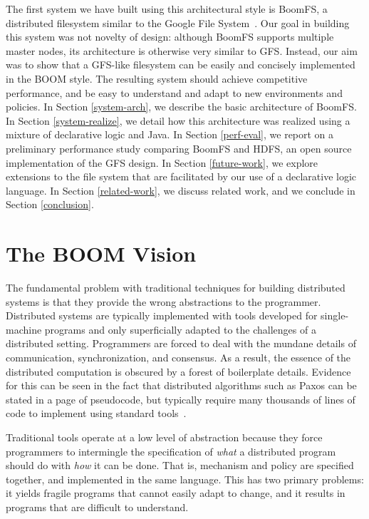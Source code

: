 \documentclass{article}
\begin{document}
The first system we have built using this architectural style is
BoomFS, a distributed filesystem similar to the Google File
System~\cite{gfs}. Our goal in building this system was not novelty of
design: although BoomFS supports multiple master nodes, its
architecture is otherwise very similar to GFS. Instead, our aim was to
show that a GFS-like filesystem can be easily and concisely
implemented in the BOOM style. The resulting system should achieve
competitive performance, and be easy to understand and adapt to new
environments and policies. In Section \ref{system-arch}, we describe
the basic architecture of BoomFS. In Section \ref{system-realize}, we
detail how this architecture was realized using a mixture of
declarative logic and Java. In Section \ref{perf-eval}, we report on a
preliminary performance study comparing BoomFS and HDFS, an open
source implementation of the GFS design. In Section \ref{future-work},
we explore extensions to the file system that are facilitated by our
use of a declarative logic language. In Section \ref{related-work}, we
discuss related work, and we conclude in Section \ref{conclusion}.

\section{The BOOM Vision}
\label{boom-vision}
The fundamental problem with traditional techniques for building
distributed systems is that they provide the wrong abstractions to the
programmer. Distributed systems are typically implemented with tools
developed for single-machine programs and only superficially adapted
to the challenges of a distributed setting. Programmers are forced to
deal with the mundane details of communication, synchronization, and
consensus. As a result, the essence of the distributed computation is
obscured by a forest of boilerplate details. Evidence for this can be
seen in the fact that distributed algorithms such as Paxos can be
stated in a page of pseudocode, but typically require many thousands
of lines of code to implement using standard
tools~\cite{paxos-made-live}.

Traditional tools operate at a low level of abstraction because they
force programmers to intermingle the specification of \emph{what} a
distributed program should do with \emph{how} it can be done. That is,
mechanism and policy are specified together, and implemented in the
same language. This has two primary problems: it yields fragile
programs that cannot easily adapt to change, and it results in
programs that are difficult to understand.
\end{document}
